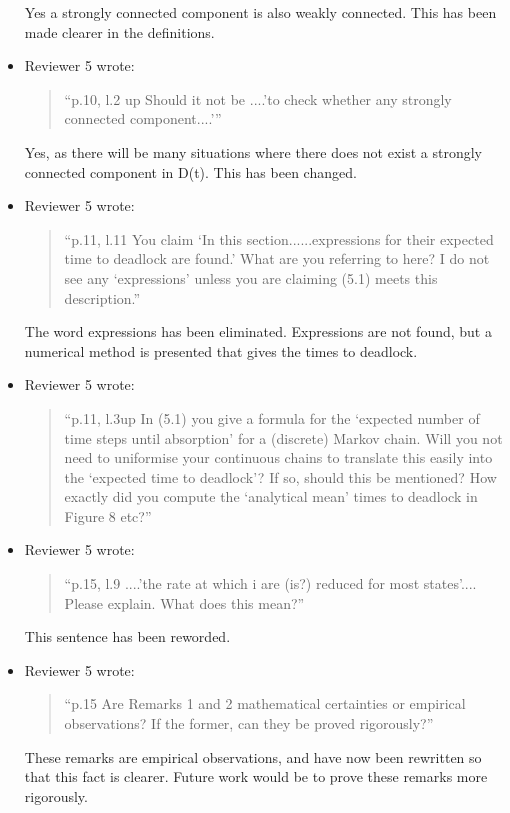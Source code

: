 \documentclass{article}
\begin{document}
\begin{itemize}
Yes a strongly connected component is also weakly connected. This has been made
clearer in the definitions.


\item Reviewer 5 wrote:
\begin{quote}
``p.10, l.2 up Should it not be ....’to check whether any strongly connected
component....’''
\end{quote}

Yes, as there will be many situations where there does not exist a strongly
connected component in D(t). This has been changed.


\item Reviewer 5 wrote:
\begin{quote}
``p.11, l.11 You claim ‘In this section......expressions for their expected time
to deadlock are found.’ What are you referring to here? I do not see any
‘expressions’ unless you are claiming (5.1) meets this description.''
\end{quote}

The word expressions has been eliminated. Expressions are not found, but a
numerical method is presented that gives the times to deadlock.


\item Reviewer 5 wrote:
\begin{quote}
``p.11, l.3up In (5.1) you give a formula for the ‘expected number of time steps
until absorption’ for a (discrete) Markov chain. Will you not need to uniformise
your continuous chains to translate this easily into the ‘expected time to
deadlock’? If so, should this be mentioned? How exactly did you compute the
‘analytical mean’ times to deadlock in Figure 8 etc?''
\end{quote}

\item Reviewer 5 wrote:
\begin{quote}
``p.15, l.9 ....’the rate at which i are (is?) reduced for most states’....
Please explain. What does this mean?''
\end{quote}

This sentence has been reworded.


\item Reviewer 5 wrote:
\begin{quote}
``p.15 Are Remarks 1 and 2 mathematical certainties or empirical observations?
If the former, can they be proved rigorously?''
\end{quote}

These remarks are empirical observations, and have now been rewritten so that
this fact is clearer. Future work would be to prove these remarks more
rigorously.


\end{itemize}
\end{document}
